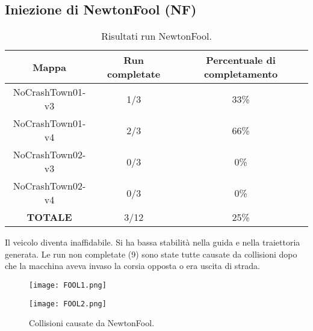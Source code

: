 \subsection{Iniezione di NewtonFool (NF)}
\begin{table}[h!]
    \begin{tabular}{|c|c|c|}
        \hline
        Mappa                   & Run completate & Percentuale di completamento\\
        \hline
        NoCrashTown01-v3        & 1/3            & 33\% \\
        NoCrashTown01-v4        & 2/3            & 66\% \\
        NoCrashTown02-v3        & 0/3            & 0\% \\
        NoCrashTown02-v4        & 0/3            & 0\%  \\
        \hline
        \textbf{TOTALE}                  & 3/12           & 25\% \\
        \hline
    \end{tabular}
    \caption{Risultati run NewtonFool.}
    \label{tab:nf}
\end{table}
Il veicolo diventa inaffidabile. Si ha bassa stabilità nella guida e nella traiettoria generata. Le run non completate (9) sono state tutte causate da collisioni dopo che la macchina
aveva invaso la corsia opposta o era uscita di strada. \begin{figure}[h]
    \centering
    \parbox{6cm}{
    \texttt{[image: FOOL1.png]}
    \label{fig:fool1}}
    \qquad
    \begin{minipage}{6cm}
    \texttt{[image: FOOL2.png]}
    \label{fig:fool2}
    \end{minipage}
    \caption{Collisioni causate da NewtonFool.}
    \label{fig:foolrun}
    \end{figure}
\newpage

